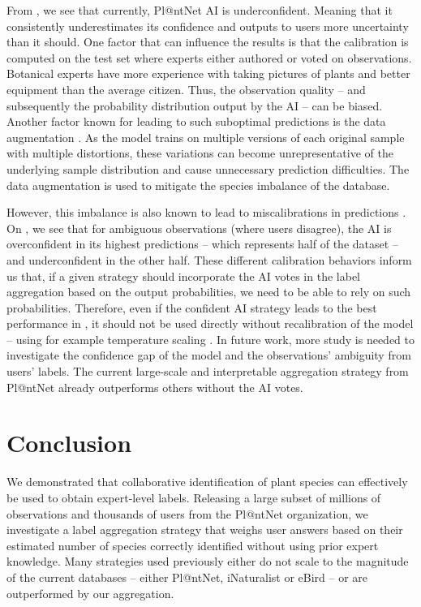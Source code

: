 From , we see that currently, Pl@ntNet AI is underconfident. Meaning that it consistently underestimates its confidence and outputs to users more uncertainty than it should.
One factor that can influence the results is that the calibration is computed on the test set where experts either authored or voted on observations.
Botanical experts have more experience with taking pictures of plants and better equipment than the average citizen.
Thus, the observation quality -- and subsequently the probability distribution output by the AI -- can be biased.
Another factor known for leading to such suboptimal predictions is the data augmentation \citep{kapoor2022uncertainty}. As the model trains on multiple versions of each original sample with multiple distortions, these variations can become unrepresentative of the underlying sample distribution and cause unnecessary prediction difficulties.
The data augmentation is used to mitigate the species imbalance of the database.

However, this imbalance is also known to lead to miscalibrations in predictions \citep{ao2023two}.
On , we see that for ambiguous observations (where users disagree), the AI is overconfident in its highest predictions -- which represents half of the dataset -- and underconfident in the other half.
These different calibration behaviors inform us that, if a given strategy should incorporate the AI votes in the label aggregation based on the output probabilities, we need to be able to rely on such probabilities.
Therefore, even if the confident AI strategy leads to the best performance in , it should not be used directly without recalibration of the model -- using for example temperature scaling \citep{guo_calibration_2017}.
In future work, more study is needed to investigate the confidence gap of the model and the observations' ambiguity from users' labels.
The current large-scale and interpretable aggregation strategy from Pl@ntNet already outperforms others without the AI votes.


\section{Conclusion}

We demonstrated that collaborative identification of plant species can effectively be used to obtain expert-level labels.
Releasing a large subset of millions of observations and thousands of users from the Pl@ntNet organization, we investigate a label aggregation strategy that weighs user answers based on their estimated number of species correctly identified without using prior expert knowledge.
Many strategies used previously either do not scale to the magnitude of the current databases -- either Pl@ntNet, iNaturalist or eBird -- or are outperformed by our aggregation.

